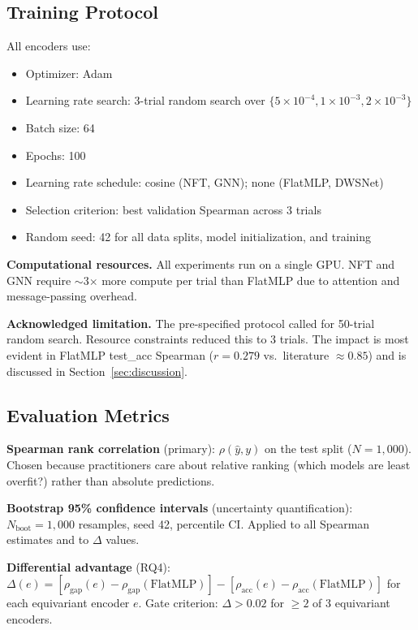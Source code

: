 \subsection{Training Protocol}

All encoders use:
\begin{itemize}
\item Optimizer: Adam
\item Learning rate search: 3-trial random search over $\{5\times10^{-4}, 1\times10^{-3}, 2\times10^{-3}\}$
\item Batch size: 64
\item Epochs: 100
\item Learning rate schedule: cosine (NFT, GNN); none (FlatMLP, DWSNet)
\item Selection criterion: best validation Spearman across 3 trials
\item Random seed: 42 for all data splits, model initialization, and training
\end{itemize}

\textbf{Computational resources.} All experiments run on a single GPU. NFT and GNN require $\sim$3$\times$ more compute
per trial than FlatMLP due to attention and message-passing overhead.

\textbf{Acknowledged limitation.} The pre-specified protocol called for 50-trial random search. Resource
constraints reduced this to 3 trials. The impact is most evident in FlatMLP test\_acc Spearman ($r = 0.279$
vs.\ literature $\approx 0.85$) and is discussed in Section~\ref{sec:discussion}.

\subsection{Evaluation Metrics}

\textbf{Spearman rank correlation} (primary): $\rho(\hat{y}, y)$ on the test split ($N = 1{,}000$). Chosen
because practitioners care about relative ranking (which models are least overfit?) rather than absolute
predictions.

\textbf{Bootstrap 95\% confidence intervals} (uncertainty quantification): $N_{\text{boot}} = 1{,}000$
resamples, seed 42, percentile CI. Applied to all Spearman estimates and to $\Delta$ values.

\textbf{Differential advantage} (RQ4): $\Delta(e) = [\rho_{\text{gap}}(e) - \rho_{\text{gap}}(\text{FlatMLP})] - [\rho_{\text{acc}}(e) - \rho_{\text{acc}}(\text{FlatMLP})]$ for each equivariant encoder $e$. Gate criterion: $\Delta > 0.02$ for $\geq 2$ of 3 equivariant encoders.

